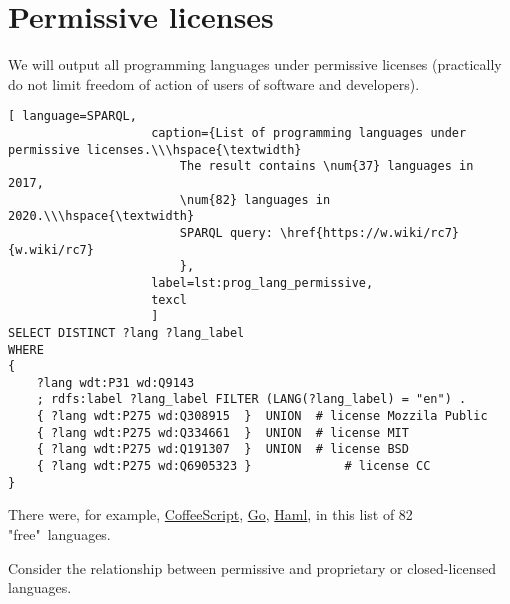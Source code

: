 \section{Permissive licenses}
We will output all programming languages under permissive licenses (practically do not limit freedom of action of users of software and developers).

\begin{lstlisting}[ language=SPARQL, 
                    caption={List of programming languages under permissive licenses.\\\hspace{\textwidth}
                        The result contains \num{37} languages in 2017, 
                        \num{82} languages in 2020.\\\hspace{\textwidth}
                        SPARQL query: \href{https://w.wiki/rc7}{w.wiki/rc7}
                        },
                    label=lst:prog_lang_permissive,
                    texcl 
                    ]
SELECT DISTINCT ?lang ?lang_label
WHERE
{
	?lang wdt:P31 wd:Q9143
	; rdfs:label ?lang_label FILTER (LANG(?lang_label) = "en") . 
	{ ?lang wdt:P275 wd:Q308915  }  UNION  # license Mozzila Public
	{ ?lang wdt:P275 wd:Q334661  }  UNION  # license MIT
	{ ?lang wdt:P275 wd:Q191307  }  UNION  # license BSD
	{ ?lang wdt:P275 wd:Q6905323 }             # license CC
}
\end{lstlisting}%

There were, for example, \href{https://en.wikipedia.org/wiki/CoffeeScript}{CoffeeScript}, \href{https://en.wikipedia.org/wiki/Go}{Go}, \href{https://en.wikipedia.org/wiki/Haml}{Haml}, in this list of 82 "free"\  languages.

Consider the relationship between permissive and proprietary or closed-licensed languages.

